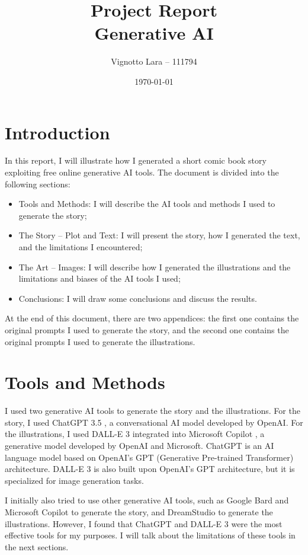 \documentclass[a4paper,11pt]{article}
\title{\Huge \textbf{Project Report}\\Generative AI}
\author{Vignotto Lara -- 111794}
\date{\today}
\begin{document}
\maketitle
\vspace{6cm}
\tableofcontents
\newpage



\section{Introduction}
In this report, I will illustrate how I generated a short comic book story exploiting free online generative AI tools. The document is divided into the following sections:
\begin{itemize}
    \item Tools and Methods: I will describe the AI tools and methods I used to generate the story;
    \item The Story -- Plot and Text: I will present the story, how I generated the text, and the limitations I encountered;
    \item The Art -- Images: I will describe how I generated the illustrations and the limitations and biases of the AI tools I used;
    \item Conclusions: I will draw some conclusions and discuss the results.
\end{itemize}
At the end of this document, there are two appendices: the first one contains the original prompts I used to generate the story, and the second one contains the original prompts I used to generate the illustrations.



\section{Tools and Methods}
I used two generative AI tools to generate the story and the illustrations. For the story, I used ChatGPT 3.5 \cite{gpt}, a conversational AI model developed by OpenAI. For the illustrations, I used DALL-E 3 integrated into Microsoft Copilot \cite{copilot2023}, a generative model developed by OpenAI and Microsoft. 
ChatGPT is an AI language model based on OpenAI's GPT (Generative Pre-trained Transformer) architecture. DALL-E 3 is also built upon OpenAI's GPT architecture, but it is specialized for image generation tasks. 

I initially also tried to use other generative AI tools, such as Google Bard \cite{bard} and Microsoft Copilot to generate the story, and DreamStudio \cite{dreamstudio} to generate the illustrations. However, I found that ChatGPT and DALL-E 3 were the most effective tools for my purposes. I will talk about the limitations of these tools in the next sections.
\end{document}
